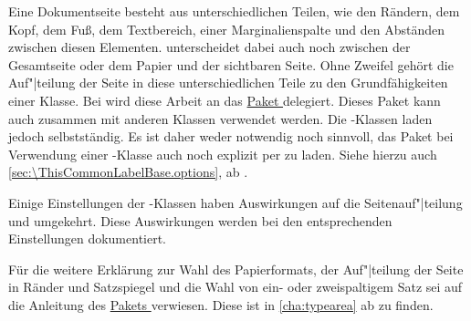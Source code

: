 Eine Dokumentseite besteht aus unterschiedlichen Teilen, wie den Rändern, dem
Kopf, dem Fuß, dem Textbereich, einer Marginalienspalte und den Abständen
zwischen diesen Elementen. \KOMAScript{} unterscheidet dabei auch noch
zwischen der Gesamtseite oder dem Papier und der sichtbaren Seite. Ohne
Zweifel gehört die Auf"|teilung der Seite in diese unterschiedlichen Teile zu
den Grundfähigkeiten einer
Klasse. Bei \KOMAScript{}
wird diese Arbeit an das \hyperref[cha:typearea]{Paket
  } delegiert. Dieses Paket kann auch
zusammen mit anderen Klassen verwendet werden. Die \KOMAScript-Klassen laden
\hyperref[cha:typearea]{} jedoch selbstständig. Es ist daher
weder notwendig noch sinnvoll, das Paket bei Verwendung einer
\KOMAScript-Klasse auch noch explizit per  zu laden. Siehe
hierzu auch \autoref{sec:\ThisCommonLabelBase.options}, ab
.

Einige Einstellungen der \KOMAScript{}-Klassen haben Auswirkungen auf die
Seitenauf"|teilung und umgekehrt. Diese Auswirkungen werden bei den
entsprechenden Einstellungen dokumentiert.

Für die weitere Erklärung zur Wahl des Papierformats, der Auf"|teilung der
Seite in Ränder und Satzspiegel und die Wahl von ein- oder zweispaltigem Satz
sei auf die Anleitung des \hyperref[cha:typearea]{Pakets
  } verwiesen. Diese ist in
\autoref{cha:typearea} ab  zu finden.



